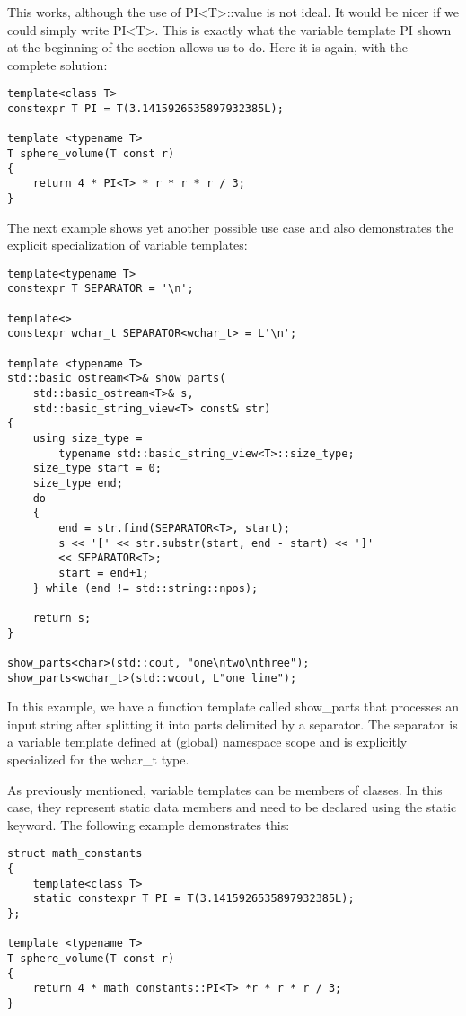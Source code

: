 This works, although the use of PI<T>::value is not ideal. It would be nicer if we could simply write PI<T>. This is exactly what the variable template PI shown at the beginning of the section allows us to do. Here it is again, with the complete solution:

\begin{lstlisting}[style=styleCXX]
template<class T>
constexpr T PI = T(3.1415926535897932385L);

template <typename T>
T sphere_volume(T const r)
{
	return 4 * PI<T> * r * r * r / 3;
}
\end{lstlisting}

The next example shows yet another possible use case and also demonstrates the explicit specialization of variable templates:

\begin{lstlisting}[style=styleCXX]
template<typename T>
constexpr T SEPARATOR = '\n';

template<>
constexpr wchar_t SEPARATOR<wchar_t> = L'\n';

template <typename T>
std::basic_ostream<T>& show_parts(
	std::basic_ostream<T>& s,
	std::basic_string_view<T> const& str)
{
	using size_type =
		typename std::basic_string_view<T>::size_type;
	size_type start = 0;
	size_type end;
	do
	{
		end = str.find(SEPARATOR<T>, start);
		s << '[' << str.substr(start, end - start) << ']'
		<< SEPARATOR<T>;
		start = end+1;
	} while (end != std::string::npos);

	return s;
}

show_parts<char>(std::cout, "one\ntwo\nthree");
show_parts<wchar_t>(std::wcout, L"one line");
\end{lstlisting}

In this example, we have a function template called show\_parts that processes an input string after splitting it into parts delimited by a separator. The separator is a variable template defined at (global) namespace scope and is explicitly specialized for the wchar\_t type.

As previously mentioned, variable templates can be members of classes. In this case, they represent static data members and need to be declared using the static keyword. The following example demonstrates this:

\begin{lstlisting}[style=styleCXX]
struct math_constants
{
	template<class T>
	static constexpr T PI = T(3.1415926535897932385L);
};

template <typename T>
T sphere_volume(T const r)
{
	return 4 * math_constants::PI<T> *r * r * r / 3;
}
\end{lstlisting}


